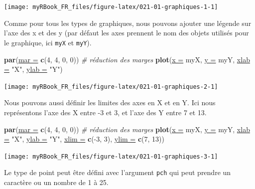 \documentclass[twoside,symmetric]{book}
\newenvironment{Shaded}{}{}
\newcommand{\CommentTok}[1]{\textit{#1}}
\newcommand{\DataTypeTok}[1]{\underline{#1}}
\newcommand{\DecValTok}[1]{#1}
\newcommand{\KeywordTok}[1]{\textbf{#1}}
\newcommand{\NormalTok}[1]{#1}
\newcommand{\OperatorTok}[1]{#1}
\newcommand{\StringTok}[1]{#1}
\begin{document}
\texttt{[image: myRBook\_FR\_files/figure-latex/021-01-graphiques-1-1]}

Comme pour tous les types de graphiques, nous pouvons ajouter une légende sur l'axe des x et des y (par défaut les axes prennent le nom des objets utilisés pour le graphique, ici \texttt{myX} et \texttt{myY}).

\begin{Shaded}
\begin{Highlighting}[]
\KeywordTok{par}\NormalTok{(}\DataTypeTok{mar =} \KeywordTok{c}\NormalTok{(}\DecValTok{4}\NormalTok{, }\DecValTok{4}\NormalTok{, }\DecValTok{0}\NormalTok{, }\DecValTok{0}\NormalTok{)) }\CommentTok{# réduction des marges}
\KeywordTok{plot}\NormalTok{(}\DataTypeTok{x =}\NormalTok{ myX, }\DataTypeTok{y =}\NormalTok{ myY, }
  \DataTypeTok{xlab =} \StringTok{"X"}\NormalTok{, }\DataTypeTok{ylab =} \StringTok{"Y"}\NormalTok{)}
\end{Highlighting}
\end{Shaded}

\texttt{[image: myRBook\_FR\_files/figure-latex/021-01-graphiques-2-1]}

Nous pouvons aussi définir les limites des axes en X et en Y. Ici nous représentons l'axe des X entre -3 et 3, et l'axe des Y entre 7 et 13.

\begin{Shaded}
\begin{Highlighting}[]
\KeywordTok{par}\NormalTok{(}\DataTypeTok{mar =} \KeywordTok{c}\NormalTok{(}\DecValTok{4}\NormalTok{, }\DecValTok{4}\NormalTok{, }\DecValTok{0}\NormalTok{, }\DecValTok{0}\NormalTok{)) }\CommentTok{# réduction des marges}
\KeywordTok{plot}\NormalTok{(}\DataTypeTok{x =}\NormalTok{ myX, }\DataTypeTok{y =}\NormalTok{ myY, }
  \DataTypeTok{xlab =} \StringTok{"X"}\NormalTok{, }\DataTypeTok{ylab =} \StringTok{"Y"}\NormalTok{, }
  \DataTypeTok{xlim =} \KeywordTok{c}\NormalTok{(}\OperatorTok{-}\DecValTok{3}\NormalTok{, }\DecValTok{3}\NormalTok{), }\DataTypeTok{ylim =} \KeywordTok{c}\NormalTok{(}\DecValTok{7}\NormalTok{, }\DecValTok{13}\NormalTok{))}
\end{Highlighting}
\end{Shaded}

\texttt{[image: myRBook\_FR\_files/figure-latex/021-01-graphiques-3-1]}

Le type de point peut être défini avec l'argument \texttt{pch} qui peut prendre un caractère ou un nombre de 1 à 25.
\end{document}
